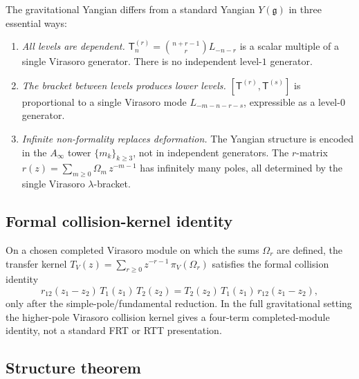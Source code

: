 \documentclass[11pt]{article}
\newcommand{\fg}{\mathfrak{g}}
\begin{document}
\begin{remark}
The gravitational Yangian differs from a standard Yangian $Y(\fg)$
in three essential ways:
\begin{enumerate}[label=(\roman*)]
\item \emph{All levels are dependent.}
  $\mathsf{T}_n^{(r)} = \binom{n+r-1}{r}L_{-n-r}$ is a scalar
  multiple of a single Virasoro generator.  There is no independent
  level-$1$ generator.

\item \emph{The bracket between levels produces lower levels.}
  $[\mathsf{T}^{(r)}, \mathsf{T}^{(s)}]$ is proportional to
  a single Virasoro mode $L_{-m-n-r-s}$, expressible as a
  level-$0$ generator.

\item \emph{Infinite non-formality replaces deformation.}
  The Yangian structure is encoded in the $A_\infty$ tower
  $\{m_k\}_{k \ge 3}$, not in independent generators.  The
  $r$-matrix $r(z) = \sum_{m \ge 0}\Omega_m\,z^{-m-1}$ has
  infinitely many poles, all determined by the single Virasoro
  $\lambda$-bracket.
\end{enumerate}
\end{remark}


\subsection{Formal collision-kernel identity}

\begin{proposition}
\label{prop:gy-rtt}
On a chosen completed Virasoro module on which the sums
$\Omega_r$ are defined, the transfer kernel
$T_V(z) = \sum_{r \ge 0} z^{-r-1}\,\pi_V(\Omega_r)$
satisfies the formal collision identity
\[
r_{12}(z_1 - z_2)\,T_1(z_1)\,T_2(z_2)
= T_2(z_2)\,T_1(z_1)\,r_{12}(z_1 - z_2),
\]
only after the simple-pole/fundamental reduction.  In the full
gravitational setting the higher-pole Virasoro collision kernel
gives a four-term completed-module identity, not a standard FRT
or RTT presentation.
\end{proposition}


\subsection{Structure theorem}
\end{document}
